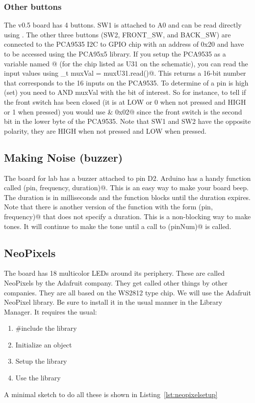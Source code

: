 \subsubsection{Other buttons}
The v0.5 board has 4 buttons. SW1 is attached to A0 and can be read directly using
\lstinline@digitalRead@. The other three buttons (SW2, FRONT\_SW, and BACK\_SW) are 
connected to the PCA9535 I2C to GPIO chip with an address of 0x20 and have to be 
accessed using the PCA95x5 library. If you setup the PCA9535 as a variable named 
@ (for the chip listed as U31 on the schematic), you can read 
the input values using _t muxVal = muxU31.read()@. This returns a 16-bit 
number that corresponds to the 16 inputs on the PCA9535. To determine of a pin is 
high (set) you need to AND muxVal with the bit of interest. So for instance, to tell 
if the front switch has been closed (it is at LOW or 0 when not pressed and HIGH or 1
when pressed) you would use \lstinline@muxVal & 0x02@ since the front switch is the second 
bit in the lower byte of the PCA9535. Note that SW1 and SW2 have the opposite polarity, 
they are HIGH when not pressed and LOW when pressed. 

\subsection{Making Noise (buzzer)}
The board for lab has a buzzer attached to pin D2. Arduino has a handy function called 
\lstinline@tone(pin, frequency, duration)@. This is an easy way to make your board beep.
The duration is in milliseconds and the function blocks until the duration expires. Note 
that there is another version of the function with the form 
\lstinline@tone(pin, frequency)@ that does not specify a duration. This is a non-blocking
way to make tones. It will continue to make the tone until a call to \lstinline@noTone(pinNum)@
is called. 


\subsection{NeoPixels}
The board has 18 multicolor LEDs around its periphery. These are called NeoPixels by the 
Adafruit company. They get called other things by other companies. They are all based on 
the WS2812 type chip. We will use the Adafruit NeoPixel library. Be sure to install it 
in the usual manner in the Library Manager. It requires the usual:
\begin{enumerate}
    \item \#include the library
    \item Initialize an object
    \item Setup the library
    \item Use the library
\end{enumerate}
A minimal sketch to do all these is shown in Listing~\ref{lst:neopixelsetup}

